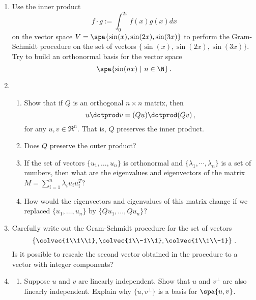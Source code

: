 \begin{enumerate}
\item Use the inner product \[f\cdot g := \int_0^{2\pi} f(x)g(x)dx\]  on the vector space $V=\spa\{\sin(x),\sin(2x),\sin(3x) \}$ to perform the Gram-Schmidt procedure on the set of vectors $\{\sin(x),\sin(2x),\sin(3x) \}$. \\
Try to build an orthonormal basis for the vector space \[\spa \{ \sin(nx)~| ~n\in \N \}\, .\]
\item 
\begin{enumerate}
\item
Show that if $Q$ is an orthogonal $n\times n$ matrix, then \[u\dotprod v = (Qu)\dotprod (Qv)\, ,\] for any $u,v\in \Re^n$. That is, $Q$ preserves the inner product. 
\item Does $Q$ preserve the outer product? 
\item  If the set of vectors $\{ u_1,\dots,u_n\}$ is orthonormal and $\{ \lambda_1,\cdots,\lambda_n\}$ is a set of numbers, 
then what are the eigenvalues and eigenvectors of the matrix
$M=\sum_{i=1}^n \lambda_i u_i u_i^T$? 
\item How would the eigenvectors and eigenvalues of this matrix change if we replaced  $\{ u_1,\dots,u_n\}$ by $\{ Qu_1,\dots,Q u_n\}$?
\end{enumerate}


\item Carefully write out the Gram-Schmidt procedure for the set of vectors 
\[\left\{ \colvec{1\\1\\1}, \colvec{1\\-1\\1}, \colvec{1\\1\\-1} \right\} \, .\] Is it possible to rescale the second vector obtained in the procedure to a vector with integer components? 


\item 
\label{basisortho}
\begin{enumerate}
\item Suppose $u$ and $v$ are linearly independent.  Show that $u$ and $v^\perp$ are also linearly independent.  Explain why $\{u, v^\perp\}$ is a basis for $\spa \{u,v\}$.





\end{enumerate}
\end{enumerate}
